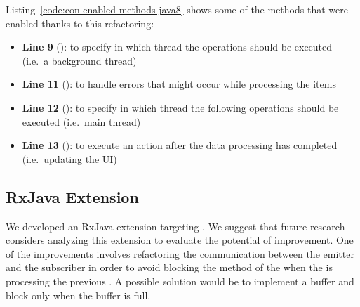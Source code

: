 \documentclass[type=bsc,accentcolor=tud9c]{tudthesis}
\newcommand{\framework}[1]{\textcolor{black}{#1}}
\begin{document}


Listing~\ref{code:con-enabled-methods-java8} shows some of the methods that were enabled thanks to this refactoring:
\begin{itemize}
	\item {\bf Line 9} (): to specify in which thread the operations should be executed (i.e.~a background thread)
	\item {\bf Line 11} (): to handle errors that might occur while processing the items
	\item {\bf Line 12} (): to specify in which thread the following operations should be executed (i.e.~main thread)
	\item {\bf Line 13} (): to execute an action after the data processing has completed (i.e.~updating the UI)
\end{itemize}



\subsection{RxJava Extension}
We developed an \framework{RxJava} extension targeting . We suggest that future research considers analyzing this extension to evaluate the potential of improvement. One of the improvements involves refactoring the communication between the emitter  and the subscriber  in order to avoid blocking the  method of the  when the  is processing the previous . A possible solution would be to implement a buffer and block only when the buffer is full.


\nocite{*}



\def\appendixstart{\chapter{Appendix} \section{SwingWorker API}\label{swingworkerapi}}


\end{document}
